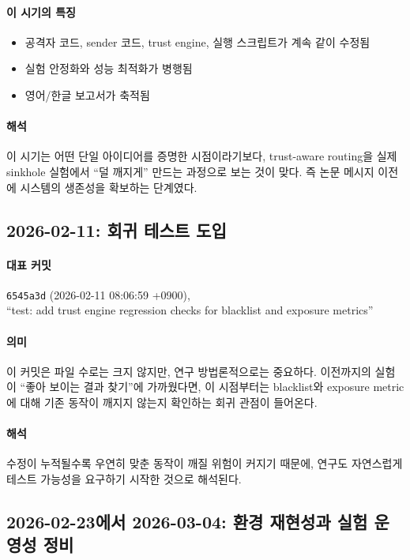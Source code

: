 \documentclass[12pt,a4paper]{article}
\begin{document}
\paragraph{이 시기의 특징}
\begin{itemize}[leftmargin=1.5em]
\item 공격자 코드, sender 코드, trust engine, 실행 스크립트가 계속 같이 수정됨
\item 실험 안정화와 성능 최적화가 병행됨
\item 영어/한글 보고서가 축적됨
\end{itemize}

\paragraph{해석}
이 시기는 어떤 단일 아이디어를 증명한 시점이라기보다,
trust-aware routing을 실제 sinkhole 실험에서 ``덜 깨지게'' 만드는 과정으로 보는 것이
맞다. 즉 논문 메시지 이전에 시스템의 생존성을 확보하는 단계였다.

\subsection{2026-02-11: 회귀 테스트 도입}

\paragraph{대표 커밋}
\texttt{6545a3d} (2026-02-11 08:06:59 +0900),\\
``test: add trust engine regression checks for blacklist and exposure metrics''

\paragraph{의미}
이 커밋은 파일 수로는 크지 않지만, 연구 방법론적으로는 중요하다.
이전까지의 실험이 ``좋아 보이는 결과 찾기''에 가까웠다면,
이 시점부터는 blacklist와 exposure metric에 대해 기존 동작이 깨지지 않는지
확인하는 회귀 관점이 들어온다.

\paragraph{해석}
수정이 누적될수록 우연히 맞춘 동작이 깨질 위험이 커지기 때문에,
연구도 자연스럽게 테스트 가능성을 요구하기 시작한 것으로 해석된다.

\subsection{2026-02-23에서 2026-03-04: 환경 재현성과 실험 운영성 정비}
\end{document}
